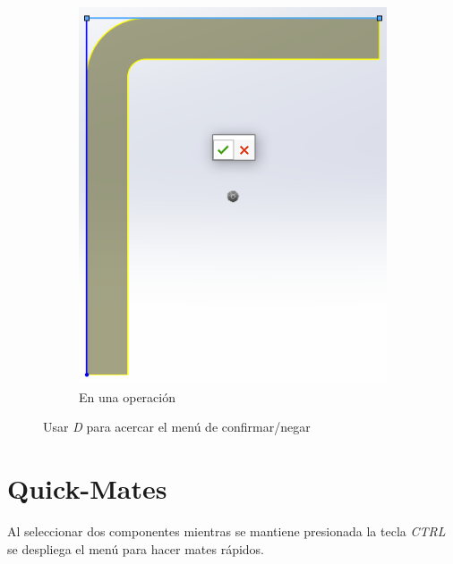 \documentclass{report}
\begin{document}
\begin{figure}[H]
\begin{subfigure}[b]{0.45\textwidth}
		\includegraphics[width=\textwidth]{Imagenes/solidworks_breadcrumbs_04}
		\caption{En una operación}
		\label{fig:solidworksbreadcrumbs04}
	\end{subfigure}
	\caption{Usar \emph{D} para acercar el menú de confirmar/negar}
\end{figure}

\chapter{Quick-Mates}

Al seleccionar dos componentes mientras se mantiene presionada la tecla \emph{CTRL} se despliega el menú para hacer mates rápidos.
\end{document}

